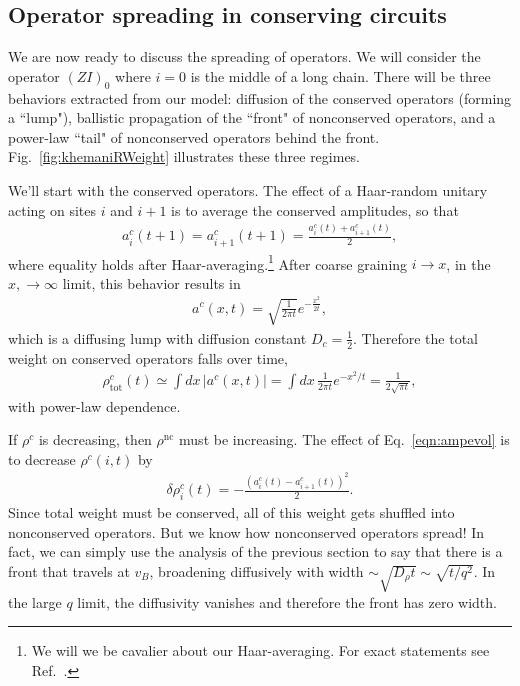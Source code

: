 \documentclass[a4paper,11pt]{article}
\renewcommand{\th}[1]{\frac{1}{#1}}
\newcommand{\abs}[1]{\left| #1 \right|}
\newcommand{\nc}{\text{nc}}
\newcommand{\tot}{\text{tot}}
\begin{document}
\subsection{Operator spreading in conserving circuits} \label{sub:consop}

We are now ready to discuss the spreading of operators. We will consider the operator $(ZI)_0$ where $i=0$ is the middle of a long chain. There will be three behaviors extracted from our model: diffusion of the conserved operators (forming a ``lump"), ballistic propagation of the ``front" of nonconserved operators, and a power-law ``tail" of nonconserved operators behind the front. Fig.~\ref{fig:khemaniRWeight} illustrates these three regimes.

We'll start with the conserved operators. The effect of a Haar-random unitary acting on sites $i$ and $i+1$ is to average the conserved amplitudes, so that
\begin{align}
a^c_i(t+1)=a^c_{i+1}(t+1) = \frac{a^c_i(t)+a^c_{i+1}(t)}{2}, \label{eqn:ampevol}
\end{align}
where equality holds after Haar-averaging.\footnote{We will we be cavalier about our Haar-averaging. For exact statements see Ref.~\cite{KhemaniOpSp}.} After coarse graining $i\to x$, in the $x, \to\infty$ limit, this behavior results in 
\begin{align}
a^c(x,t) = \sqrt{\frac{1}{2\pi t}}e^{-\frac{x^2}{2t}},
\end{align}
which is a diffusing lump with diffusion constant $D_c=\th{2}$. Therefore the total weight on conserved operators falls over time,
\begin{align}
\rho^c_\tot(t) \simeq \int dx\,\abs{a^c(x,t)} = \int dx\,\th{2\pi t}e^{-x^2/t} 
	=\th{2\sqrt{\pi t}}, \label{eqn:rhoc}
\end{align}
with power-law dependence.

If $\rho^c$ is decreasing, then $\rho^\nc$ must be increasing. The effect of Eq.~\ref{eqn:ampevol} is to decrease $\rho^c(i,t)$ by
\begin{align}
\delta \rho^c_i(t) = -\frac{(a^c_i(t)-a^c_{i+1}(t))^2}{2}.
\end{align}
Since total weight must be conserved, all of this weight gets shuffled into nonconserved operators. But we know how nonconserved operators spread! In fact, we can simply use the analysis of the previous section to say that there is a front that travels at $v_B$, broadening diffusively with width $\sim\sqrt{D_\rho t}\sim\sqrt{t/q^2}$. In the large $q$ limit, the diffusivity vanishes and therefore the front has zero width.
\end{document}
